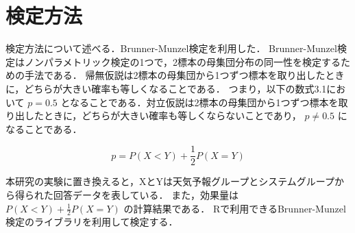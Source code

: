 \section{検定方法}
検定方法について述べる．Brunner-Munzel検定\cite{1361981469031994624}を利用した．
Brunner-Munzel検定はノンパラメトリック検定の1つで，2標本の母集団分布の同一性を検定するための手法である．
帰無仮説は2標本の母集団から1つずつ標本を取り出したときに，どちらが大きい確率も等しくなることである．
つまり，以下の数式3.1において
\begin{math}
  p=0.5
\end{math}
となることである．対立仮説は2標本の母集団から1つずつ標本を取り出したときに，どちらが大きい確率も等しくならないことであり，
\begin{math}
  p\neq0.5
\end{math}
になることである．

\begin{equation}
  p = P(X < Y) + \frac{1}{2}P(X = Y)
\end{equation}

本研究の実験に置き換えると，XとYは天気予報グループとシステムグループから得られた回答データを表している．
また，効果量は
\begin{math}
  P(X < Y) + \frac{1}{2}P(X = Y)
\end{math}
の計算結果である．
Rで利用できるBrunner-Munzel検定のライブラリ\cite{cranBrunnerMunzel}を利用して検定する．

